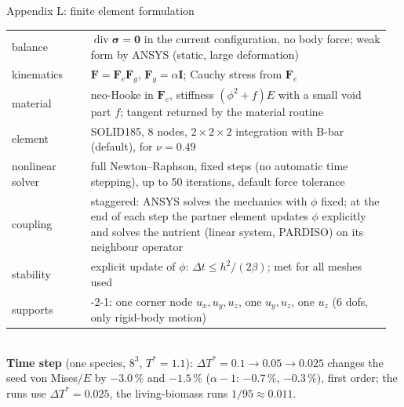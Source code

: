 \documentclass[aspectratio=169,11pt]{beamer}
\begin{document}
\begin{frame}{Appendix L: finite element formulation}
\scriptsize\renewcommand{\arraystretch}{1.15}
\begin{tabular}{@{}>{\raggedright}p{0.2\linewidth}>{\raggedright\arraybackslash}p{0.76\linewidth}@{}}
\toprule
balance & $\operatorname{div}\boldsymbol\sigma=\mathbf 0$ in the current configuration, no body force; weak form by ANSYS (static, large deformation)\\
kinematics & $\mathbf F=\mathbf F_e\mathbf F_g$, $\mathbf F_g=\alpha\mathbf I$; Cauchy stress from $\mathbf F_e$\\
material & neo-Hooke in $\mathbf F_e$, stiffness $(\phi^2+f)E$ with a small void part $f$; tangent returned by the material routine\\
element & SOLID185, 8 nodes, $2\times2\times2$ integration with B-bar (default), for $\nu=0.49$\\
nonlinear solver & full Newton--Raphson, fixed steps (no automatic time stepping), up to 50 iterations, default force tolerance\\
coupling & staggered: ANSYS solves the mechanics with $\phi$ fixed; at the end of each step the partner element
            updates $\phi$ explicitly and solves the nutrient (linear system, PARDISO) on its neighbour operator\\
stability & explicit update of $\phi$: $\Delta t\le h^2/(2\beta)$; met for all meshes used\\
supports & 3-2-1: one corner node $u_x,u_y,u_z$, one $u_y,u_z$, one $u_z$ (6 dofs, only rigid-body motion)\\
\bottomrule
\end{tabular}\\[6pt]
\textbf{Time step} (one species, $8^3$, $T^*=1.1$): $\Delta T^*=0.1\to0.05\to0.025$ changes the seed von Mises$/E$ by
$-3.0\,\%$ and $-1.5\,\%$ ($\alpha-1$: $-0.7\,\%$, $-0.3\,\%$), first order; the runs use $\Delta T^*=0.025$, the living-biomass runs $1/95\approx0.011$.
\end{frame}
\end{document}
